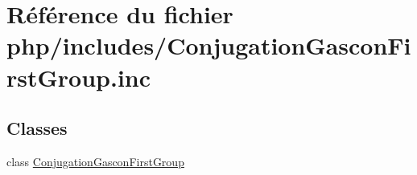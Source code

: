 \hypertarget{_conjugation_gascon_first_group_8inc}{}\section{Référence du fichier php/includes/\+Conjugation\+Gascon\+First\+Group.inc}
\label{_conjugation_gascon_first_group_8inc}
\subsection*{Classes}
\begin{DoxyCompactItemize}
\item 
class \hyperlink{class_conjugation_gascon_first_group}{Conjugation\+Gascon\+First\+Group}
\end{DoxyCompactItemize}
